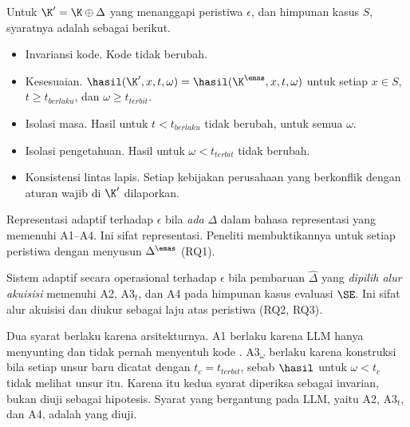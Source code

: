 \begin{definisi}
\label{def:syarat}
Untuk $\K' = \K \oplus \Delta$ yang menanggapi peristiwa $\epsilon$, dan himpunan kasus $S$, syaratnya adalah sebagai berikut.
\begin{itemize}[leftmargin=3.4em,labelsep=0.4em,nosep]
  \item[(A1)] Invariansi kode. Kode  tidak berubah.
  \item[(A2)] Kesesuaian. $\hasil(\K', x, t, \omega) = \hasil(\K^{\emas}, x, t, \omega)$ untuk setiap $x \in S$, $t \geq t_{\mathit{berlaku}}$, dan $\omega \geq t_{\mathit{terbit}}$.
  \item[(A3$_t$)] Isolasi masa. Hasil untuk $t < t_{\mathit{berlaku}}$ tidak berubah, untuk semua $\omega$.
  \item[(A3$_\omega$)] Isolasi pengetahuan. Hasil untuk $\omega < t_{\mathit{terbit}}$ tidak berubah.
  \item[(A4)] Konsistensi lintas lapis. Setiap kebijakan perusahaan yang berkonflik dengan aturan wajib di $\K'$ dilaporkan.
\end{itemize}
\end{definisi}

\begin{definisi}
\label{def:adapt-rep}
Representasi adaptif terhadap $\epsilon$ bila \emph{ada} $\Delta$ dalam bahasa representasi yang memenuhi A1--A4. Ini sifat representasi. Peneliti membuktikannya untuk setiap peristiwa dengan menyusun $\Delta^{\emas}$ (RQ1).
\end{definisi}

\begin{definisi}
\label{def:adapt-op}
Sistem adaptif secara operasional terhadap $\epsilon$ bila pembaruan $\hat{\Delta}$ yang \emph{dipilih alur akuisisi} memenuhi A2, A3$_t$, dan A4 pada himpunan kasus evaluasi $\SE$. Ini sifat alur akuisisi dan diukur sebagai laju atas peristiwa (RQ2, RQ3).
\end{definisi}

Dua syarat berlaku karena arsitekturnya. A1 berlaku karena LLM hanya menyunting  dan tidak pernah menyentuh kode . A3$_\omega$ berlaku karena konstruksi bila setiap unsur baru dicatat dengan $t_c = t_{\mathit{terbit}}$, sebab $\hasil$ untuk $\omega < t_c$ tidak melihat unsur itu. Karena itu kedua syarat diperiksa sebagai invarian, bukan diuji sebagai hipotesis. Syarat yang bergantung pada LLM, yaitu A2, A3$_t$, dan A4, adalah yang diuji.

